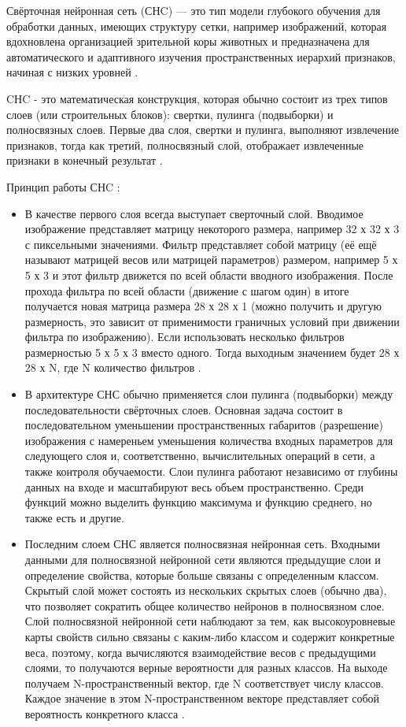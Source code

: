 Свёрточная нейронная сеть (СНC) — это тип модели глубокого обучения для обработки данных, имеющих структуру сетки, например изображений, которая вдохновлена организацией зрительной коры животных \cite{neronnetwork1013, neronnetwork1014} и предназначена для автоматического и адаптивного изучения пространственных иерархий признаков, начиная с низких уровней \cite{neronnetwork10}.

CНC - это математическая конструкция, которая обычно состоит из трех типов слоев (или строительных блоков): свертки, пулинга (подвыборки) и полносвязных слоев. Первые два слоя, свертки и пулинга, выполняют извлечение признаков, тогда как третий, полносвязный слой, отображает извлеченные признаки в конечный результат \cite{neronnetwork10}.

Принцип работы СНC \cite{neronnetwork11}:
\begin{itemize}
	\item В качестве первого слоя всегда выступает сверточный слой. Вводимое изображение представляет матрицу некоторого размера, например 32 х 32 х 3 с пиксельными значениями. Фильтр представляет собой матрицу (её ещё называют матрицей весов или матрицей параметров) размером, например 5 х 5 х 3 и этот фильтр движется по всей области вводного изображения. После прохода фильтра по всей области (движение с шагом один) в итоге получается новая матрица размера 28 х 28 х 1 (можно получить и другую размерность, это зависит от применимости граничных условий при движении фильтра по изображению). Если использовать несколько фильтров размерностью 5 х 5 х 3 вместо одного. Тогда выходным значением будет 28 х 28 х N, где N количество фильтров .
	\item В архитектуре СНС обычно применяется слои пулинга (подвыборки) между последовательности свёрточных слоев. Основная задача состоит в последовательном уменьшении пространственных габаритов (разрешение) изображения с намереньем уменьшения количества входных параметров для следующего слоя и, соответственно, вычислительных операций в сети, а также контроля обучаемости. Слои пулинга работают независимо от глубины данных на входе и масштабируют весь объем пространственно. Среди функций можно выделить функцию максимума и функцию среднего, но также есть и другие.
	\item Последним слоем СНС является полносвязная нейронная сеть. Входными данными для полносвязной нейронной сети являются предыдущие слои и определение свойства, которые больше связаны с определенным классом. Скрытый слой может состоять из нескольких скрытых слоев (обычно два), что позволяет сократить общее количество нейронов в полносвязном слое. Слой полносвязной нейронной сети наблюдают за тем, как высокоуровневые карты свойств сильно связаны с каким-либо классом и содержит конкретные веса, поэтому, когда вычисляются взаимодействие весов с предыдущими слоями, то получаются верные вероятности для разных классов. На выходе получаем N-пространственный вектор, где N соответствует числу классов. Каждое значение в этом N-пространственном векторе представляет собой вероятность конкретного класса \cite{neronnetwork113}.

\end{itemize}
